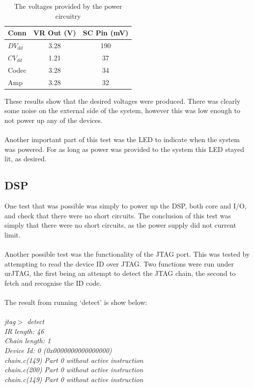 \begin{table}[H]
	\centering
	\begin{tabular}[c]{| l | c | c |}
		\hline
		Conn		& VR Out (V)	& SC Pin (mV)	\\
		\hline
		$DV_{dd}$	& 3.28		& 190		\\
		$CV_{dd}$	& 1.21		& 37		\\
		Codec		& 3.28		& 34		\\
		Amp		& 3.28		& 32		\\
		\hline
	\end{tabular}
	\caption{The voltages provided by the power circuitry}
	\label{tab:powisotest}
\end{table}

\noindent These results show that the desired voltages were produced.
There was clearly some noise on the external side of the system, however this was low enough to not power up any of the devices.
\\
\\
Another important part of this test was the LED to indicate when the system was powered.
For as long as power was provided to the system this LED stayed lit, as desired.


\subsection{DSP}
One test that was possible was simply to power up the DSP, both core and I/O, and check that there were no short circuits.
The conclusion of this test was simply that there were no short circuits, as the power supply did not current limit.
\\
\\
Another possible test was the functionality of the JTAG port.
This was tested by attempting to read the device ID over JTAG.
Two functions were run under urJTAG, the first being an attempt to detect the JTAG chain, the second to fetch and recognise the ID code.
\\
\\
The result from running `detect' is show below:
\\
\\
\emph{
\indent jtag$>$ detect	\\
\indent IR  length: 46	\\
\indent Chain length: 1	\\
\indent Device Id: 0 (0x0000000000000000)	\\
\indent chain.c(149) Part 0 without active instruction	\\
\indent chain.c(200) Part 0 without active instruction	\\
\indent chain.c(149) Part 0 without active instruction	\\
}

